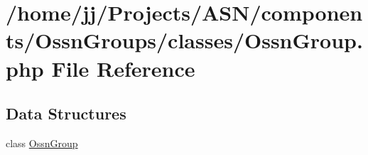 \hypertarget{_ossn_group_8php}{}\section{/home/jj/\+Projects/\+A\+S\+N/components/\+Ossn\+Groups/classes/\+Ossn\+Group.php File Reference}
\label{_ossn_group_8php}
\subsection*{Data Structures}
\begin{DoxyCompactItemize}
\item 
class \hyperlink{class_ossn_group}{Ossn\+Group}
\end{DoxyCompactItemize}
